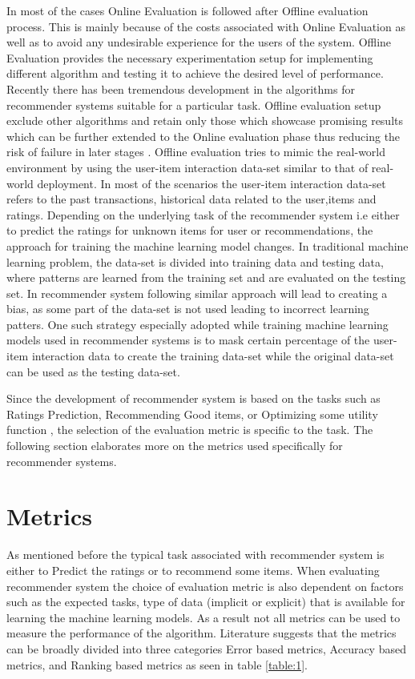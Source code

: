 \begin{itemize}
	In most of the cases Online Evaluation is followed after Offline evaluation process. This is mainly because of the costs associated with Online Evaluation as well as to avoid any undesirable experience for the users of the system. Offline Evaluation provides the necessary experimentation setup for implementing different algorithm and testing it to achieve the desired level of performance. Recently there has been tremendous development in the algorithms for recommender systems suitable for a particular task. Offline evaluation setup exclude other algorithms and retain only those which showcase promising results which can be further extended to the Online evaluation phase thus reducing the risk of failure in later stages \autocite[2941]{gunawardana2009survey}. Offline evaluation tries to mimic the real-world environment by using the user-item interaction data-set similar to that of real-world deployment. In most of the scenarios the user-item interaction data-set refers to the past transactions, historical data related to the user,items and ratings. Depending on the underlying task of the recommender system i.e either to predict the ratings for unknown items for user or recommendations, the approach for training the machine learning model changes. In traditional machine learning problem, the data-set is divided into training data and testing data, where patterns are learned from the training set and are evaluated on the testing set. In recommender system following similar approach will lead to creating a bias, as some part of the data-set is not used leading to incorrect learning patters. One such strategy especially adopted while training machine learning models used in recommender systems is to mask certain percentage of the user-item interaction data to create the training data-set while the original data-set can be used as the testing data-set.
	
\end{itemize}


Since the development of recommender system is based on the tasks such as Ratings Prediction, Recommending Good items, or Optimizing some utility function \autocite[2938]{gunawardana2009survey}, the selection of the evaluation metric is specific to the task. The following section elaborates more on the metrics used specifically for recommender systems.

\section{Metrics}
As mentioned before the typical task associated with recommender system is either to Predict the ratings or to recommend some items. When evaluating recommender system the choice of evaluation metric is also dependent on factors such as the expected tasks, type of data (implicit or explicit) that is available for learning the machine learning models. As a result not all metrics can be used to measure the performance of the algorithm. Literature suggests that the metrics can be broadly divided into three categories Error based metrics, Accuracy based metrics, and Ranking based metrics as seen in table \ref{table:1}.  \\

